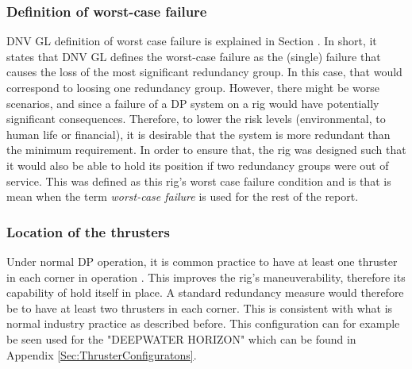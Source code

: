 \subsubsection*{Definition of worst-case failure} \label{Sec:worstCaseFailure}
DNV GL definition of worst case failure is explained in Section . In short, it states that DNV GL defines the worst-case failure as the (single) failure that causes the loss of the most significant redundancy group. In this case, that would correspond to loosing one redundancy group. However, there might be worse scenarios, and since a failure of a DP system on a rig would have potentially significant consequences. Therefore, to lower the risk levels (environmental, to human life or financial), it is desirable that the system is more redundant than the minimum requirement. In order to ensure that, the rig was designed such that it would also be able to hold its position if two redundancy groups were out of service. This was defined as this rig's worst case failure condition and is that is mean when the term \textit{worst-case failure} is used for the rest of the report. %
 
 
\subsubsection*{Location of the thrusters}
Under normal DP operation, it is common practice to have at least one thruster in each corner in operation \cite{RedundantDesignIntention_DNV}.
This improves the rig's maneuverability, therefore its capability of hold itself in place. A standard redundancy measure would therefore be to have at least two thrusters in each corner. This is consistent with what is normal industry practice as described before. This configuration can for example be seen used for the "DEEPWATER HORIZON" which can be found in Appendix \ref{Sec:ThrusterConfiguratons}. 
 
